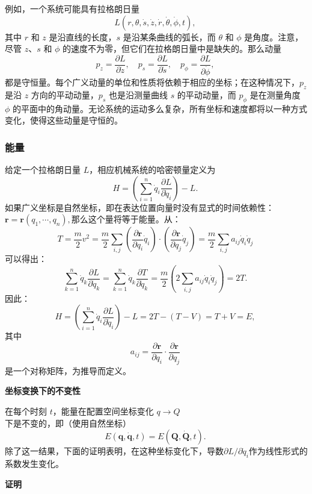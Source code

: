 例如，一个系统可能具有拉格朗日量
\[
L(r, \theta, \dot{s}, \dot{z}, \dot{r}, \dot{\theta}, \dot{\phi}, t),~
\]
其中 \( r \) 和 \( z \) 是沿直线的长度，\( s \) 是沿某条曲线的弧长，而 \( \theta \) 和 \( \phi \) 是角度。注意，尽管 \( z \)、\( s \) 和 \( \phi \) 的速度不为零，但它们在拉格朗日量中是缺失的。那么动量
\[
p_{z} = \frac{\partial L}{\partial \dot{z}}, \quad p_{s} = \frac{\partial L}{\partial \dot{s}}, \quad p_{\phi} = \frac{\partial L}{\partial \dot{\phi}},~
\]
都是守恒量。每个广义动量的单位和性质将依赖于相应的坐标；在这种情况下，\( p_z \) 是沿 \( z \) 方向的平动动量，\( p_s \) 也是沿测量曲线 \( s \) 的平动动量，而 \( p_{\phi} \) 是在测量角度 \( \phi \) 的平面中的角动量。无论系统的运动多么复杂，所有坐标和速度都将以一种方式变化，使得这些动量是守恒的。
\subsubsection{能量}
给定一个拉格朗日量 \( L \)，相应机械系统的哈密顿量定义为
\[
H = \left(\sum_{i=1}^{n} \dot{q}_{i} \frac{\partial L}{\partial \dot{q}_{i}}\right) - L.~
\]
如果广义坐标是自然坐标，即在表达位置向量时没有显式的时间依赖性：\(\mathbf{r} = \mathbf{r}(q_{1}, \cdots, q_{n}),\)那么这个量将等于能量。从：
\[
T = \frac{m}{2} v^{2} = \frac{m}{2} \sum_{i,j} \left(\frac{\partial \mathbf{r}}{\partial q_{i}} \dot{q}_{i}\right) \cdot \left(\frac{\partial \mathbf{r}}{\partial q_{j}} \dot{q}_{j}\right) = \frac{m}{2} \sum_{i,j} a_{ij} \dot{q}_{i} \dot{q}_{j}~
\]
可以得出：
\[
\sum_{k=1}^{n} \dot{q}_{k} \frac{\partial L}{\partial \dot{q}_{k}} = \sum_{k=1}^{n} \dot{q}_{k} \frac{\partial T}{\partial \dot{q}_{k}} = \frac{m}{2} \left(2\sum_{i,j} a_{ij} \dot{q}_{i} \dot{q}_{j}\right) = 2T.~
\]
因此：
\[
H = \left(\sum_{i=1}^{n} \dot{q}_{i} \frac{\partial L}{\partial \dot{q}_{i}}\right) - L = 2T - (T - V) = T + V = E,~
\]
其中
\[
a_{ij} = \frac{\partial \mathbf{r}}{\partial q_{i}} \cdot \frac{\partial \mathbf{r}}{\partial q_{j}}~
\]
是一个对称矩阵，为推导而定义。

\textbf{坐标变换下的不变性}

在每个时刻 \( t \)，能量在配置空间坐标变化 \( q \rightarrow Q \) 下是不变的，即（使用自然坐标）
\[
E(\mathbf{q}, \dot{\mathbf{q}}, t) = E(\mathbf{Q}, \dot{\mathbf{Q}}, t).~
\]
除了这一结果，下面的证明表明，在这种坐标变化下，导数\(\partial L/\partial \dot{q}_{i}\)作为线性形式的系数发生变化。 

\textbf{证明}

